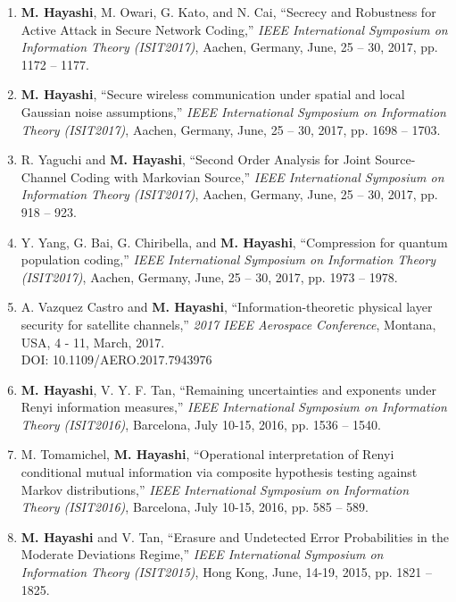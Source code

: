 \documentclass[a4paper,12pt,oneside]{article}
\begin{document}
\begin{enumerate}
    \item
    \textbf{M. Hayashi}, M. Owari, G. Kato, and N. Cai,
    ``Secrecy and Robustness for Active Attack in Secure Network Coding,''
    {\em IEEE International Symposium on Information Theory (ISIT2017)}, 
    Aachen, Germany, June, 25 -- 30, 2017, pp. 1172 -- 1177.
    
    \item
    \textbf{M. Hayashi},
    ``Secure wireless communication under spatial and local Gaussian noise assumptions,''
    {\em IEEE International Symposium on Information Theory (ISIT2017)}, 
    Aachen, Germany, June, 25 -- 30, 2017, pp. 1698 -- 1703.
    
    \item
    R. Yaguchi and \textbf{M. Hayashi},
    ``Second Order Analysis for Joint Source-Channel Coding with Markovian Source,''
    {\em IEEE International Symposium on Information Theory (ISIT2017)}, 
    Aachen, Germany, June, 25 -- 30, 2017, pp. 918 -- 923.
    
    \item
    Y. Yang, G. Bai, G. Chiribella, and \textbf{M. Hayashi},
    ``Compression for quantum population coding,''
    {\em IEEE International Symposium on Information Theory (ISIT2017)}, 
    Aachen, Germany, June, 25 -- 30, 2017, pp. 1973 -- 1978.
    
    \item
    A. Vazquez Castro and \textbf{M. Hayashi}, ``Information-theoretic physical layer security for satellite channels,'' 
    {\em 2017 IEEE Aerospace Conference}, Montana, USA, 4 - 11, March, 2017.\\
    DOI: 10.1109/AERO.2017.7943976
    
    \item
    \textbf{M. Hayashi}, V. Y. F. Tan, ``Remaining uncertainties and exponents under Renyi information measures,'' 
    {\em IEEE International Symposium on Information Theory (ISIT2016)}, 
    Barcelona, July 10-15, 2016, pp. 1536 -- 1540.
    
    \item
    M. Tomamichel, \textbf{M. Hayashi}, ``Operational interpretation of Renyi conditional mutual information via composite hypothesis testing against Markov distributions,'' 
    {\em IEEE International Symposium on Information Theory (ISIT2016)}, 
    Barcelona, July 10-15, 2016, pp. 585 -- 589.
    
    \item
    \textbf{M. Hayashi} and V. Tan, 
    ``Erasure and Undetected Error Probabilities in the Moderate Deviations Regime,'' 
    {\em IEEE International Symposium on Information Theory (ISIT2015)},
    Hong Kong, June, 14-19, 2015, pp. 1821 -- 1825.
    

\end{enumerate}
\end{document}
